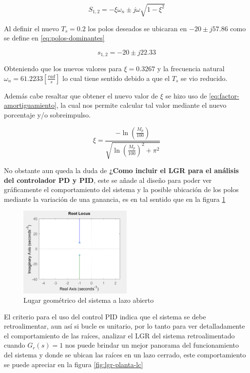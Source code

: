\documentclass[conference]{IEEEtran}
\begin{document}
	\begin{equation}
		S_{1,2} = -\xi \omega_n \pm j\omega \sqrt{1-\xi^2}
		\label{eq:polos-deseados}
	\end{equation}
	
	Al definir el nuevo $T_s = 0.2$ los polos deseados se ubicaran en $-20 \pm j57.86$ como se define en \ref{eq:polos-dominantes}
	
	\begin{equation}
		s_{1,2} = -20 \pm j22.33 
		\label{eq:polos-dominantes}
	\end{equation}
	
	Obteniendo que los nuevos valores para $\xi = 0.3267$ y la frecuencia natural $\omega_n = 61.2233 [\frac{rad}{s}]$ lo cual tiene sentido debido a que el $T_s$ se vio reducido.	

	
	Además cabe resaltar que obtener el nuevo valor de $\xi$ se hizo uso de \ref{eq:factor-amortiguamiento}, la cual nos permite calcular tal valor mediante el nuevo porcentaje y/o sobreimpulso.
	
	\begin{equation}
		\xi = \frac{-\ln(\frac{M_p}{100})}{\sqrt{\ln(\frac{M_p}{100})^2 + \pi^2}}
		\label{eq:factor-amortiguamiento} 	
	\end{equation}
	
	No obstante aun queda la duda de \textbf{¿Como incluir el LGR para el análisis del controlador PD y PID}, este se añade al diseño para poder ver gráficamente el comportamiento del sistema y la posible ubicación de los polos mediante la variación de una ganancia, es en tal sentido que en la figura \ref{fig:lgr-planta}
	
	\begin{figure}[h]
		\centering
		\includegraphics[width=0.5\textwidth]{media1/lgr-planta.png}
		\caption{Lugar geométrico del sistema a lazo abierto}
		\label{fig:lgr-planta}
	\end{figure}
	
	El criterio para el uso del control PID indica que el sistema se debe retroalimentar, aun así si bucle es unitario, por lo tanto para ver detalladamente el comportamiento de las raíces, analizar el LGR del sistema retroalimentado cuando $G_r(s) = 1$ nos puede brindar un mejor panorama del funcionamiento del sistema y donde se ubican las raíces en un lazo cerrado, este comportamiento se puede apreciar en la figura \ref{fig:lgr-planta-lc}
	
\end{document}
